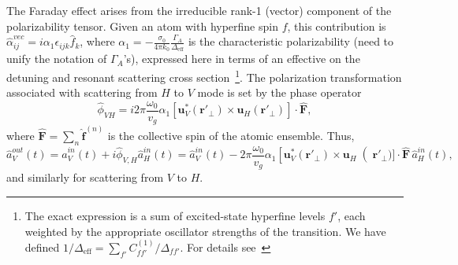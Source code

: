 \documentclass[preprint,aps,pra,onecolumn,superscriptaddress]{revtex4-1} %
\newcommand{\mbf}[1]{\mathbf{#1}}
\newcommand{\eff}{\text{eff}}
\newcommand{\comment}[1]{{\color{Maroon} #1}}
\begin{document}
The Faraday effect arises from the irreducible rank-1 (vector) component of the polarizability tensor.  Given an atom with hyperfine spin $f$, this contribution is $\hat{\alpha}^{vec}_{ij} = i \alpha_1 \epsilon_{ijk} \hat{f}_k$, where $\alpha_1 = -\frac{\sigma_0}{4\pi k_0 }\frac{\Gamma_A}{\Delta_{\eff}} $ is the characteristic polarizability \comment{(need to unify the notation of $ \Gamma_A $'s)}, expressed here in terms of an effective on the detuning and resonant scattering cross section~\footnote{The exact expression is a sum of excited-state hyperfine levels $f'$, each weighted by the appropriate oscillator strengths of the transition.  We have defined $1/\Delta_{\eff} = \sum_{f'} C^{(1)}_{ff'}/\Delta_{ff'}$. For details see~\cite{Qi2016}}.   The polarization transformation associated with scattering from $H$ to $V$ mode is set by the phase operator
\begin{equation}
\hat{\phi}_{VH} = i 2\pi \frac{\omega_0}{v_g}\alpha_1 \left[ \mbf{u}^*_V (\mbf{r}'_\perp) \times  \mbf{u}_{H} (\mbf{r}'_\perp) \right] \cdot \hat{\mbf{F}},
\end{equation}
where $\hat{\mbf{F}}=\sum_n \hat{\mbf{f}}^{(n)}$ is the collective spin of the atomic ensemble.  Thus,
\begin{equation}\label{eq:aoutain}
\hat{a}^{out}_V(t) = \hat{a}^{in}_V(t)  +i  \hat{\phi}_{V,H} \hat{a}^{in}_{H}(t)= \hat{a}^{in}_V(t)  - 2\pi \frac{\omega_0}{v_g}\alpha_1 \left[ \mbf{u}^*_V (\mbf{r}'_\perp) \times  \mbf{u}_{H}\right(\mbf{r}'_\perp)]  \cdot \hat{\mbf{F}}\, \hat{a}^{in}_{H}(t),
\end{equation}
 and similarly for scattering from $V$ to $H$.
\end{document}
